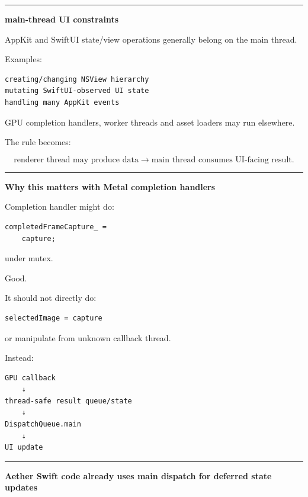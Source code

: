 \begin{center}\rule{0.5\linewidth}{0.5pt}\end{center}

\textbf{main-thread UI constraints}

AppKit and SwiftUI state/view operations generally belong on the main thread.

Examples:

\begin{verbatim}
creating/changing NSView hierarchy
mutating SwiftUI-observed UI state
handling many AppKit events
\end{verbatim}

GPU completion handlers, worker threads and asset loaders may run elsewhere.

The rule becomes:

\[
\boxed{
\text{renderer thread may produce data}
\rightarrow
\text{main thread consumes UI-facing result}.
}
\]

\begin{center}\rule{0.5\linewidth}{0.5pt}\end{center}

\textbf{Why this matters with Metal completion handlers}

Completion handler might do:

\begin{verbatim}
completedFrameCapture_ =
    capture;
\end{verbatim}

under mutex.

Good.

It should not directly do:

\begin{verbatim}
selectedImage = capture
\end{verbatim}

or manipulate  from unknown callback thread.

Instead:

\begin{verbatim}
GPU callback
    ↓
thread-safe result queue/state
    ↓
DispatchQueue.main
    ↓
UI update
\end{verbatim}

\begin{center}\rule{0.5\linewidth}{0.5pt}\end{center}

\textbf{Aether Swift code already uses main dispatch for deferred state updates}

